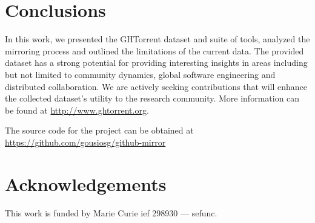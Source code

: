\documentclass[conference]{IEEEtran}
\begin{document}
\section{Conclusions}

In this work, we presented the GHTorrent dataset and suite of tools, analyzed
the mirroring process and outlined the limitations of the current data.  The
provided dataset has a strong potential for providing interesting insights in
areas including but not limited to community dynamics, global software
engineering and distributed collaboration. We are actively seeking contributions
that will enhance the collected dataset's utility to the research community. 
More information can be found at \url{http://www.ghtorrent.org}.

The source code for the project can be obtained at \url{https://github.com/gousiosg/github-mirror}

\section*{Acknowledgements}
This work is funded by Marie Curie {\sc ief} 298930 --- {\sc sefunc}.



\end{document}
